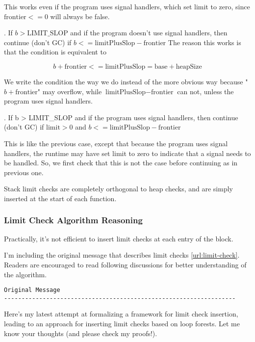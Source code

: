 This works even if the program uses signal handlers, which set
limit to zero, since $\mbox{frontier} <= 0$ will always be false.

. If $b > \mbox{LIMIT_SLOP}$ and if the program doesn't use
signal handlers, then continue (don't GC) if $b <=
\mbox{limitPlusSlop} - \mbox{frontier}$ The reason this works is that
the condition is equivalent to

\begin{equation}
  b + \mbox{frontier} <= \mbox{limitPlusSlop} = \mbox{base} +
  \mbox{heapSize}
\end{equation}

We write the condition the way we do instead of the more obvious way
because "$b + \mbox{frontier}$" may overflow, while
$\mbox{limitPlusSlop} - \mbox{frontier}$ can not, unless the program
uses signal handlers.

. If b > LIMIT_SLOP and if the program uses signal
handlers, then continue (don't GC) if $\mbox{limit} > 0$ and $b <=
\mbox{limitPlusSlop} - \mbox{frontier}$

This is like the previous case, except that because the program uses signal
handlers, the runtime may have set limit to zero to indicate that a
signal needs to be handled.  So, we first check that this is not
the case before continuing as in previous one.

Stack limit checks are completely orthogonal to heap checks, and are simply
inserted at the start of each function.

\subsubsection{Limit Check Algorithm Reasoning}
Practically, it's not efficient to insert limit checks at each
entry of the block.

I'm including the original message that describes limit checks
\ref{url:limit-check}. Readers are encouraged to read following
discussions for better understanding of the algorithm.

\begin{verbatim}
Original Message
------------------------------------------------------------------
\end{verbatim}

Here's my latest attempt at formalizing a framework for limit check
insertion, leading to an approach for inserting limit checks based on
loop forests.  Let me know your thoughts (and please check my
proofs!).

